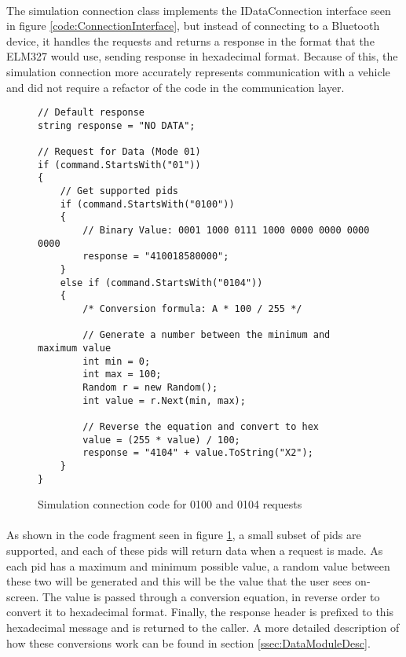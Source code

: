 		\paragraph{}{
		The simulation connection class implements the IDataConnection interface seen in figure \ref{code:ConnectionInterface}, but instead of connecting to a Bluetooth device, it handles the requests and returns a response in the format that the ELM327 would use, sending response in hexadecimal format. Because of this, the simulation connection more accurately represents communication with a vehicle and did not require a refactor of the code in the communication layer.
		}	
		\begin{figure}[h]
			\begin{lstlisting}
// Default response
string response = "NO DATA";

// Request for Data (Mode 01)
if (command.StartsWith("01"))
{
	// Get supported pids
	if (command.StartsWith("0100"))
    {
		// Binary Value: 0001 1000 0111 1000 0000 0000 0000 0000
		response = "410018580000";
	}
    else if (command.StartsWith("0104"))
	{
    	/* Conversion formula: A * 100 / 255 */
    	
    	// Generate a number between the minimum and maximum value
        int min = 0;
		int max = 100;
        Random r = new Random();
		int value = r.Next(min, max);

		// Reverse the equation and convert to hex
        value = (255 * value) / 100;
		response = "4104" + value.ToString("X2");
	}
}
			\end{lstlisting}
			\caption{Simulation connection code for 0100 and 0104 requests}
			\label{code:SimConnectionData}
		\end{figure}

		\paragraph{}{
		As shown in the code fragment seen  in figure \ref{code:SimConnectionData}, a small subset of pids are supported, and each of these pids will return data when a request is made. As each pid has a maximum and minimum possible value, a random value between these two will be generated and this will be the value that the user sees on-screen. The value  is passed through a conversion equation, in reverse order to convert it to hexadecimal format. Finally, the response header is prefixed to this hexadecimal message and is returned to the caller. A more detailed description of how these conversions work can be found in section \ref{ssec:DataModuleDesc}.
		}
